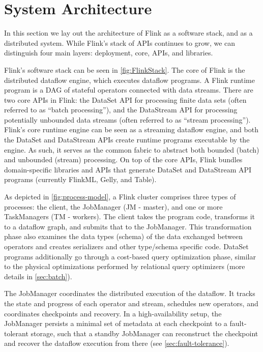
\section{System Architecture}

In this section we lay out the architecture of Flink as a software stack, and as a distributed system. While Flink's stack of APIs continues to grow, we can distinguish four main layers: deployment, core, APIs, and libraries.

 Flink's software stack can be seen in \autoref{fig:FlinkStack}. The core of Flink is the distributed dataflow engine, which executes dataflow programs. A Flink runtime program is a DAG of stateful operators connected with data streams. There are two core APIs in Flink: the DataSet API for processing finite data sets (often referred to as “batch processing”), and the DataStream API for processing potentially unbounded data streams (often referred to as “stream processing”). Flink’s core runtime engine can be seen as a streaming dataflow engine, and both the DataSet and DataStream APIs create runtime programs executable by the engine. As such, it serves as the common fabric to abstract both bounded (batch) and unbounded (stream) processing. On top of the core APIs, Flink bundles domain-specific libraries and APIs that generate DataSet and DataStream API programs (currently FlinkML, Gelly, and Table). 

As depicted in \autoref{fig:process-model}, a Flink cluster comprises three types of processes: the client, the JobManager (JM - master), and one or more TaskManagers (TM - workers). The client takes the program code, transforms it to a dataflow graph, and submits that to the JobManager. This transformation phase also examines the data types (schema) of the data exchanged between operators and creates serializers and other type/schema specific code. DataSet programs additionally go through a cost-based query optimization phase, similar to the physical optimizations performed by relational query optimizers (more details in \autoref{sec:batch}).

The JobManager coordinates the distributed execution of the dataflow. It tracks the state and progress of each operator and stream, schedules new operators, and coordinates checkpoints and recovery. In a high-availability setup, the JobManager persists a minimal set of metadata at each checkpoint to a fault-tolerant storage, such that a standby JobManager can reconstruct the checkpoint and recover the dataflow execution from there (see \autoref{sec:fault-tolerance}).

